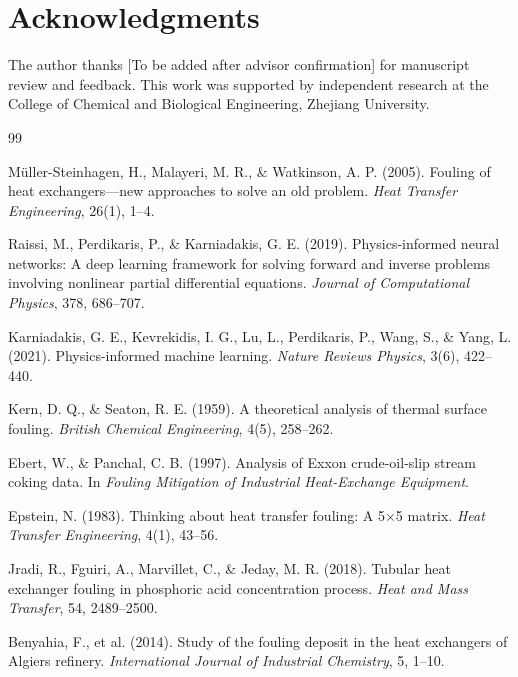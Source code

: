 \documentclass[review]{elsarticle}
\begin{document}
\section*{Acknowledgments}

The author thanks [To be added after advisor confirmation] for manuscript review and feedback. This work was supported by independent research at the College of Chemical and Biological Engineering, Zhejiang University.


\begin{thebibliography}{99}

M\"uller-Steinhagen, H., Malayeri, M. R., \& Watkinson, A. P. (2005).
Fouling of heat exchangers---new approaches to solve an old problem.
\textit{Heat Transfer Engineering}, 26(1), 1--4.

Raissi, M., Perdikaris, P., \& Karniadakis, G. E. (2019).
Physics-informed neural networks: A deep learning framework for solving forward and inverse problems involving nonlinear partial differential equations.
\textit{Journal of Computational Physics}, 378, 686--707.

Karniadakis, G. E., Kevrekidis, I. G., Lu, L., Perdikaris, P., Wang, S., \& Yang, L. (2021).
Physics-informed machine learning.
\textit{Nature Reviews Physics}, 3(6), 422--440.

Kern, D. Q., \& Seaton, R. E. (1959).
A theoretical analysis of thermal surface fouling.
\textit{British Chemical Engineering}, 4(5), 258--262.

Ebert, W., \& Panchal, C. B. (1997).
Analysis of Exxon crude-oil-slip stream coking data.
In \textit{Fouling Mitigation of Industrial Heat-Exchange Equipment}.

Epstein, N. (1983).
Thinking about heat transfer fouling: A 5$\times$5 matrix.
\textit{Heat Transfer Engineering}, 4(1), 43--56.

Jradi, R., Fguiri, A., Marvillet, C., \& Jeday, M. R. (2018).
Tubular heat exchanger fouling in phosphoric acid concentration process.
\textit{Heat and Mass Transfer}, 54, 2489--2500.

Benyahia, F., et al. (2014).
Study of the fouling deposit in the heat exchangers of Algiers refinery.
\textit{International Journal of Industrial Chemistry}, 5, 1--10.


\end{thebibliography}
\end{document}
